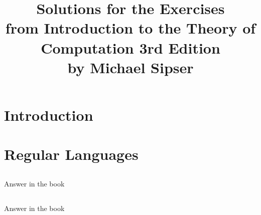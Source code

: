 \documentclass[12pt]{book}
\title{Solutions for the Exercises\\from Introduction to the Theory of Computation 3rd Edition \\by Michael Sipser}
\begin{document}
\setcounter{chapter}{-1}

\maketitle
\chapter{Introduction}

\chapter{Regular Languages}
\section{}
Answer in the book
\section{}
Answer in the book
\section{}
\section{}
\section{}
\section{}
\section{}
\section{}
\section{}
\section{}
\section{}
\section{}
\end{document}
